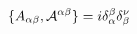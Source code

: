 \begin{equation}
\{A_{\alpha\beta}, {\cal{A}}^{\alpha\beta}\} =i\delta_\alpha^\beta \delta_\beta^\nu
\end{equation}

